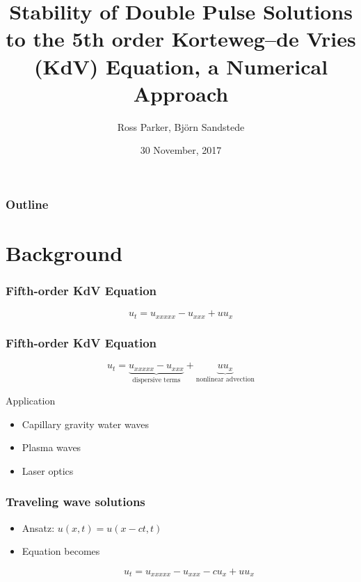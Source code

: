 \documentclass[16pt]{beamer}
\title[Stability of Double Pulses]{Stability of Double Pulse Solutions to the 5th order Korteweg–de Vries (KdV) Equation, a Numerical Approach}
\author[R. Parker]{Ross Parker, Bj\"{o}rn Sandstede}
\institute{Brown University}
\date{30 November, 2017}
\begin{document}
 
\frame{\titlepage}
 
\begin{frame}
\frametitle{Outline}
\tableofcontents
\end{frame}

\section{Background}

\begin{frame}
	\frametitle{Fifth-order KdV Equation }   
	\fontsize{18}{7.2}\selectfont
	\begin{center}
		\[ u_t = u_{xxxxx} - u_{xxx} + u u_x \]
	\end{center}
\end{frame}

\begin{frame}
	\frametitle{Fifth-order KdV Equation}
	\fontsize{18}{7.2}\selectfont
	\begin{description}
		\item<1->
			\begin{center}
			\[ u_t = \underbrace{u_{xxxxx} - u_{xxx}}_{\text{dispersive terms}} + \underbrace{u u_x}_{\text{nonlinear advection}} \]
			\end{center}
		\vspace{0.5cm}
		\item<2->

		Application
		\begin{itemize}
			\item Capillary gravity water waves
			\item Plasma waves
			\item Laser optics
		\end{itemize}
	\end{description}
\end{frame}

\begin{frame}
	\frametitle{Traveling wave solutions}
	\fontsize{18}{7.2}\selectfont
	\begin{itemize}
		\item<1-> Ansatz: $u(x, t) = u(x - ct, t) $

		\vspace{0.5cm}
		\item<2-> Equation becomes
		\begin{center}
		\[ u_t = u_{xxxxx} - u_{xxx} - c u_x + u u_x \]
		\end{center}
	\end{itemize}
\end{frame}
\end{document}
